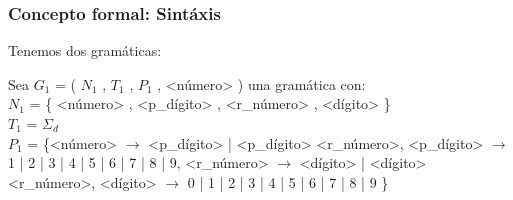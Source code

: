 \documentclass[xcolor=table]{beamer}
\begin{document}
\begin{frame}[fragile]\frametitle{Concepto formal: Sintáxis} \small  

Tenemos dos gramáticas:\hfill \break

Sea $G_1$ = ( $N_1$ , $T_1$ , $P_1$ , <número> ) una gramática con:\\
\vspace{0.1cm}
$N_1$ = \{ <número> , <p\_dígito> , <r\_número> , <dígito> \}\\
\vspace{0.1cm}
$T_1$ = $\Sigma_d$\\
\vspace{0.1cm}
$P_1$ = \{<número> $\rightarrow$ <p\_dígito>\break
\vspace{0.1cm}
\hspace{2.5cm} | <p\_dígito> <r\_número>,\break
\vspace{0.1cm}
\hspace{0.5cm}<p\_dígito> $\rightarrow$ 1 | 2 | 3 | 4 | 5 | 6 | 7 | 8 | 9,\break
\vspace{0.1cm}
\hspace{0.5cm}<r\_número> $\rightarrow$ <dígito>\break
\vspace{0.1cm}
\hspace{2.5cm} | <dígito> <r\_número>,\break
\vspace{0.1cm}
\hspace{0.5cm} <dígito> $\rightarrow$ 0 | 1 | 2 | 3 | 4 | 5 | 6 | 7 | 8 | 9 \}\break

\end{frame}
\end{document}
